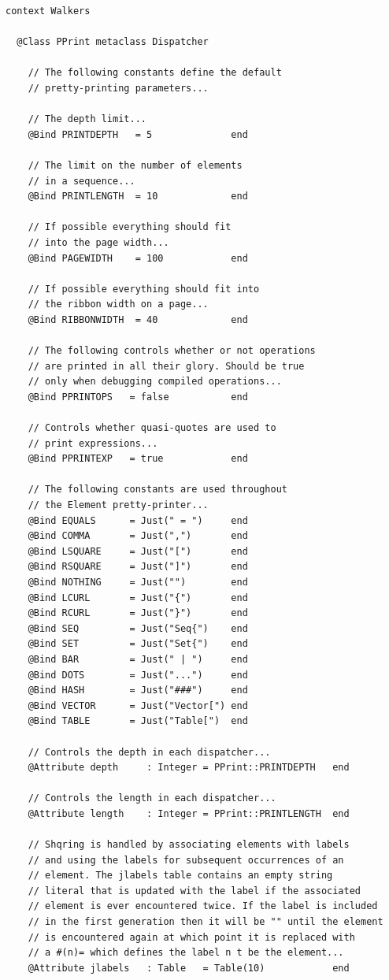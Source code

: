 \begin{lstlisting}
context Walkers

  @Class PPrint metaclass Dispatcher 
  
    // The following constants define the default
    // pretty-printing parameters...
    
    // The depth limit...
    @Bind PRINTDEPTH   = 5              end
    
    // The limit on the number of elements 
    // in a sequence...
    @Bind PRINTLENGTH  = 10             end
    
    // If possible everything should fit 
    // into the page width...
    @Bind PAGEWIDTH    = 100            end
    
    // If possible everything should fit into 
    // the ribbon width on a page...
    @Bind RIBBONWIDTH  = 40             end
    
    // The following controls whether or not operations
    // are printed in all their glory. Should be true 
    // only when debugging compiled operations...
    @Bind PPRINTOPS   = false           end
   
    // Controls whether quasi-quotes are used to
    // print expressions...
    @Bind PPRINTEXP   = true            end
    
    // The following constants are used throughout
    // the Element pretty-printer...
    @Bind EQUALS      = Just(" = ")     end
    @Bind COMMA       = Just(",")       end
    @Bind LSQUARE     = Just("[")       end
    @Bind RSQUARE     = Just("]")       end
    @Bind NOTHING     = Just("")        end
    @Bind LCURL       = Just("{")       end
    @Bind RCURL       = Just("}")       end
    @Bind SEQ         = Just("Seq{")    end
    @Bind SET         = Just("Set{")    end
    @Bind BAR         = Just(" | ")     end
    @Bind DOTS        = Just("...")     end
    @Bind HASH        = Just("###")     end
    @Bind VECTOR      = Just("Vector[") end
    @Bind TABLE       = Just("Table[")  end
    
    // Controls the depth in each dispatcher...
    @Attribute depth     : Integer = PPrint::PRINTDEPTH   end
    
    // Controls the length in each dispatcher...
    @Attribute length    : Integer = PPrint::PRINTLENGTH  end
    
    // Shqring is handled by associating elements with labels
    // and using the labels for subsequent occurrences of an 
    // element. The jlabels table contains an empty string
    // literal that is updated with the label if the associated
    // element is ever encountered twice. If the label is included
    // in the first generation then it will be "" until the element
    // is encountered again at which point it is replaced with
    // a #(n)= which defines the label n t be the element...
    @Attribute jlabels   : Table   = Table(10)            end
    

\end{lstlisting}
